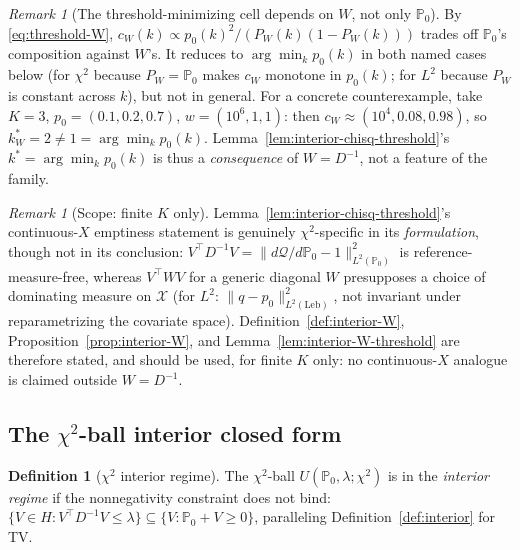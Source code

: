 \documentclass[11pt]{article}
\theoremstyle{plain}
\theoremstyle{definition}
\newtheorem{definition}[theorem]{Definition}
\theoremstyle{remark}
\newtheorem{remark}[theorem]{Remark}
\newcommand{\PP}{\mathbb{P}}
\newcommand{\cX}{\mathcal{X}}
\newcommand{\Q}{\mathcal{Q}}
\begin{document}
\begin{remark}[The threshold-minimizing cell depends on $W$, not only $\PP_0$]\label{rem:w-threshold-cell}
By \eqref{eq:threshold-W}, $c_W(k)\propto p_0(k)^2/(P_W(k)(1-P_W(k)))$ trades off
$\PP_0$'s composition against $W$'s. It reduces to $\arg\min_kp_0(k)$ in both named
cases below (for $\chi^2$ because $P_W=\PP_0$ makes $c_W$ monotone in $p_0(k)$; for
$L^2$ because $P_W$ is constant across $k$), but not in general. For a concrete
counterexample, take $K=3$, $p_0=(0.1,0.2,0.7)$, $w=(10^6,1,1)$: then
$c_W\approx(10^4,0.08,0.98)$, so $k^*_W=2\ne1=\arg\min_kp_0(k)$.
Lemma~\ref{lem:interior-chisq-threshold}'s $k^*=\arg\min_kp_0(k)$ is thus a
\emph{consequence} of $W=D^{-1}$, not a feature of the family.
\end{remark}

\begin{remark}[Scope: finite $K$ only]\label{rem:w-scope-limit}
Lemma~\ref{lem:interior-chisq-threshold}'s continuous-$X$ emptiness statement is
genuinely $\chi^2$-specific in its \emph{formulation}, though not in its conclusion:
$V^\top D^{-1}V=\|d\Q/d\PP_0-1\|^2_{L^2(\PP_0)}$ is reference-measure-free, whereas
$V^\top WV$ for a generic diagonal $W$ presupposes a choice of dominating measure on
$\cX$ (for $L^2$: $\|q-p_0\|^2_{L^2(\mathrm{Leb})}$, not invariant under reparametrizing
the covariate space). Definition~\ref{def:interior-W}, Proposition~\ref{prop:interior-W},
and Lemma~\ref{lem:interior-W-threshold} are therefore stated, and should be used, for
finite $K$ only: no continuous-$X$ analogue is claimed outside $W=D^{-1}$.
\end{remark}

\subsection{The $\chi^2$-ball interior closed form}

\begin{definition}[$\chi^2$ interior regime]\label{def:interior-chisq}
The $\chi^2$-ball $U(\PP_0,\lambda;\chi^2)$ is in the \emph{interior regime} if the
nonnegativity constraint does not bind: $\{V\in H:V^\top D^{-1}V\le\lambda\}\subseteq
\{V:\PP_0+V\ge0\}$, paralleling Definition~\ref{def:interior} for TV.
\end{definition}
\end{document}
